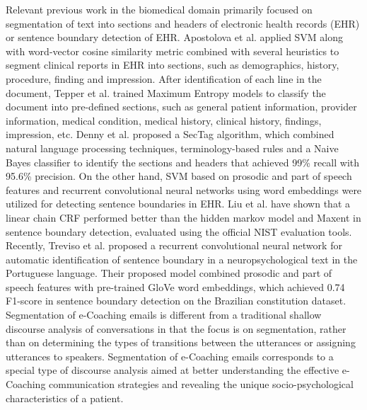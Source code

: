 \documentclass{amia}
\begin{document}
Relevant previous work in the biomedical domain primarily focused on segmentation of text into sections and headers of electronic health records (EHR)\cite{apostolova2009automatic,denny2009evaluation,tepper2012statistical,cho2002text} or sentence boundary detection of EHR.\cite{griffis2016quantitative,kreuzthaler2015detection,treviso2017sentence} Apostolova et al. applied SVM along with word-vector cosine similarity metric combined with several heuristics to segment clinical reports in EHR into sections, such as demographics, history, procedure, finding and impression.\cite{apostolova2009automatic} After identification of each line in the document, Tepper et al. trained Maximum Entropy models to classify the document into pre-defined sections, such as general patient information, provider information, medical condition, medical history, clinical history, findings, impression, etc.\cite{tepper2012statistical} Denny et al. proposed a SecTag algorithm, which combined natural language processing techniques, terminology-based rules and a Naive Bayes classifier to identify the sections and headers that achieved 99\% recall with 95.6\% precision. \cite{denny2009evaluation} On the other hand, SVM based on prosodic and part of speech features \cite{kreuzthaler2015detection} and recurrent convolutional neural networks using word embeddings \cite{griffis2016quantitative} were utilized for detecting sentence boundaries in EHR. Liu et al. have shown that a linear chain CRF performed better than the hidden markov model and Maxent in sentence boundary detection, evaluated using the official
NIST evaluation tools.\cite{liu2005using} Recently, Treviso et al. proposed a recurrent convolutional neural network for automatic identification of sentence boundary in a neuropsychological text in the Portuguese language.\cite{treviso2017sentence} Their proposed model combined prosodic and part of speech features with pre-trained GloVe word embeddings,\cite{pennington2014glove} which achieved 0.74 F1-score in sentence boundary detection on the Brazilian constitution dataset. Segmentation of e-Coaching emails is different from a traditional shallow discourse analysis of conversations \cite{galley2003discourse} in that the focus is on segmentation, rather than on determining the types of transitions between the utterances or assigning utterances to speakers. Segmentation of e-Coaching emails corresponds to a special type of discourse analysis \cite{webber2012discourse} aimed at better understanding the effective e-Coaching communication strategies and revealing the unique socio-psychological characteristics of a patient.
\end{document}
